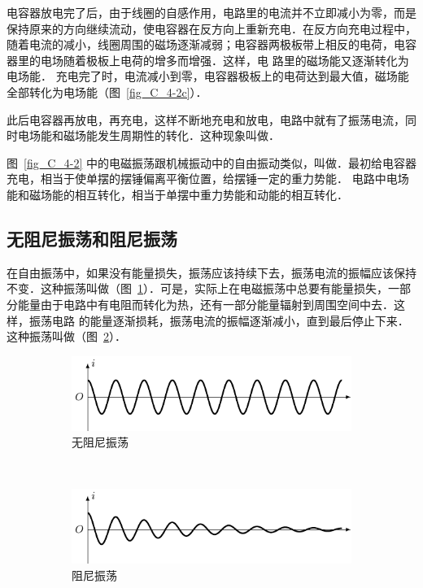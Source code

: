 电容器放电完了后，由于线圈的自感作用，电路里的电流并不立即减小为零，而是保持原来的方向继续流动，使电容器在反方向上重新充电．在反方向充电过程中，随着电流的减小，线圈周围的磁场逐渐减弱；电容器两极板带上相反的电荷，电容器里的电场随着极板上电荷的增多而增强．这样，电
路里的磁场能又逐渐转化为电场能．
充电完了时，电流减小到零，电容器极板上的电荷达到最大值，磁场能全部转化为电场能（图~\ref{fig_C_4-2c}）．

此后电容器再放电，再充电，这样不断地充电和放电，电路中就有了振荡电流，同时电场能和磁场能发生周期性的转化．这种现象叫做．

图~\ref{fig_C_4-2} 中的电磁振荡跟机械振动中的自由振动类似，叫做．最初给电容器充电，相当于使单摆的摆锤偏离平衡位置，给摆锤一定的重力势能．
电路中电场能和磁场能的相互转化，相当于单摆中重力势能和动能的相互转化．

\subsection{无阻尼振荡和阻尼振荡}

在自由振荡中，如果没有能量损失，振荡应该持续下去，振荡电流的振幅应该保持不变．这种振荡叫做（图~\ref{fig_C_4-3a}）．可是，实际上在电磁振荡中总要有能量损失，一部分能量由于电路中有电阻而转化为热，还有一部分能量辐射到周围空间中去．这样，振荡电路
的能量逐渐损耗，振荡电流的振幅逐渐减小，直到最后停止下来．这种振荡叫做（图~\ref{fig_C_4-3b}）．
\begin{figure}[htbp]
    \centering
    \begin{subfigure}{0.8\linewidth}
        \centering
        \includegraphics{fig/C/4-3a.pdf}
        \caption{无阻尼振荡}\label{fig_C_4-3a}
    \end{subfigure}
    \\
    \begin{subfigure}{0.8\linewidth}
        \centering
        \includegraphics{fig/C/4-3b.pdf}
        \caption{阻尼振荡}\label{fig_C_4-3b}
    \end{subfigure}
    \caption{}\label{fig_C_4-3}
\end{figure}

